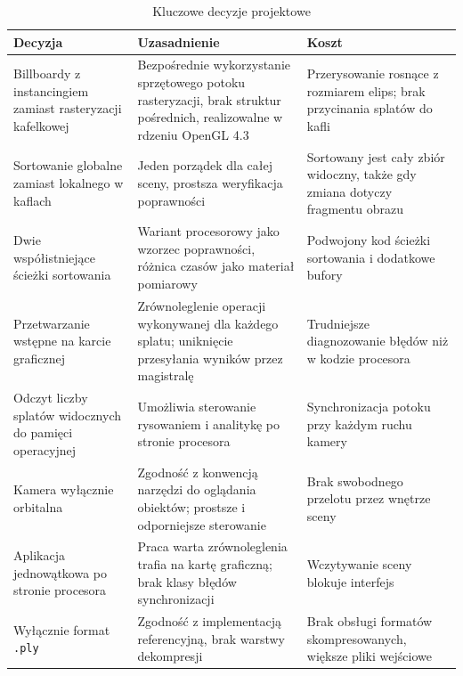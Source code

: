 \begin{table}[htbp]
  \centering
  \caption{Kluczowe decyzje projektowe}
  \label{tab:decyzje}
  \small
  \renewcommand{\arraystretch}{1.15}
  \begin{tabularx}{\textwidth}{
      >{\raggedright\arraybackslash}p{}
      >{\raggedright\arraybackslash}X
      >{\raggedright\arraybackslash}X}
    \toprule
    \textbf{Decyzja} & \textbf{Uzasadnienie} & \textbf{Koszt} \\
    \midrule
    Billboardy z instancingiem zamiast rasteryzacji kafelkowej &
      Bezpośrednie wykorzystanie sprzętowego potoku rasteryzacji, brak
      struktur pośrednich, realizowalne w rdzeniu OpenGL 4.3 &
      Przerysowanie rosnące z rozmiarem elips; brak przycinania splatów do
      kafli \\
    Sortowanie globalne zamiast lokalnego w kaflach &
      Jeden porządek dla całej sceny, prostsza weryfikacja poprawności &
      Sortowany jest cały zbiór widoczny, także gdy zmiana dotyczy
      fragmentu obrazu \\
    Dwie współistniejące ścieżki sortowania &
      Wariant procesorowy jako wzorzec poprawności, różnica czasów jako
      materiał pomiarowy &
      Podwojony kod ścieżki sortowania i dodatkowe bufory \\
    Przetwarzanie wstępne na karcie graficznej &
      Zrównoleglenie operacji wykonywanej dla każdego splatu; uniknięcie
      przesyłania wyników przez magistralę &
      Trudniejsze diagnozowanie błędów niż w kodzie procesora \\
    Odczyt liczby splatów widocznych do pamięci operacyjnej &
      Umożliwia sterowanie rysowaniem i analitykę po stronie procesora &
      Synchronizacja potoku przy każdym ruchu kamery \\
    Kamera wyłącznie orbitalna &
      Zgodność z konwencją narzędzi do oglądania obiektów; prostsze
      i odporniejsze sterowanie &
      Brak swobodnego przelotu przez wnętrze sceny \\
    Aplikacja jednowątkowa po stronie procesora &
      Praca warta zrównoleglenia trafia na kartę graficzną; brak klasy
      błędów synchronizacji &
      Wczytywanie sceny blokuje interfejs \\
    Wyłącznie format \texttt{.ply} &
      Zgodność z implementacją referencyjną, brak warstwy dekompresji &
      Brak obsługi formatów skompresowanych, większe pliki wejściowe \\
    \bottomrule
  \end{tabularx}
\end{table}
 
